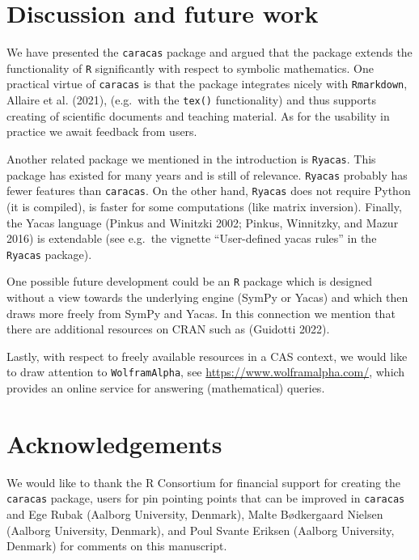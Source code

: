\hypertarget{discussion-and-future-work}{%
\section{Discussion and future work}\label{discussion-and-future-work}}

We have presented the \texttt{caracas} package and argued that the
package extends the functionality of \texttt{R} significantly with respect to
symbolic mathematics. One practical virtue of \texttt{caracas} is
that the package integrates nicely with \texttt{Rmarkdown},
Allaire et al. (2021), (e.g.~with the \texttt{tex()} functionality) and thus
supports creating of scientific documents and teaching material. As
for the usability in practice we await feedback from users.

Another related package we mentioned in the introduction is \texttt{Ryacas}.
This package has existed for many years and is still of relevance.
\texttt{Ryacas} probably has fewer features than \texttt{caracas}. On the other
hand, \texttt{Ryacas} does not require Python (it is compiled), is faster for
some computations (like matrix inversion). Finally, the Yacas language
(Pinkus and Winitzki 2002; Pinkus, Winnitzky, and Mazur 2016) is extendable (see e.g.~the vignette
``User-defined yacas rules'' in the \texttt{Ryacas} package).

One possible future development could be an \texttt{R} package which is
designed without a view towards the underlying engine (SymPy or Yacas)
and which then draws more freely from SymPy and Yacas.
In this connection we mention that there are additional resources
on CRAN such as  (Guidotti 2022).

Lastly, with respect to freely available resources in a CAS context, we would
like to draw attention to \texttt{WolframAlpha}, see
\url{https://www.wolframalpha.com/}, which provides an online service for
answering (mathematical) queries.

\hypertarget{acknowledgements}{%
\section{Acknowledgements}\label{acknowledgements}}

We would like to thank the R Consortium for financial support for
creating the \texttt{caracas} package, users for pin pointing points
that can be improved in \texttt{caracas} and Ege Rubak (Aalborg
University, Denmark), Malte Bødkergaard Nielsen (Aalborg
University, Denmark), and Poul Svante Eriksen (Aalborg
University, Denmark)
for comments on this manuscript.

